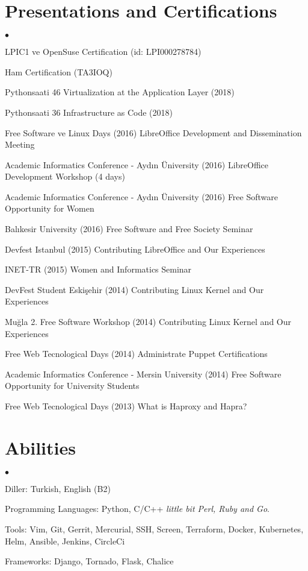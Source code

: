 \documentclass[margin,line]{res}
\newenvironment{list2}{
  \begin{list}{$\bullet$}{%
      \setlength{\itemsep}{0in}
      \setlength{\parsep}{0in} \setlength{\parskip}{0in}
      \setlength{\topsep}{0in} \setlength{\partopsep}{0in}
      \setlength{\leftmargin}{0.1in}}}{\end{list}}
\begin{document}
\begin{resume}
\section{\sc Presentations and Certifications}
\begin{list2}
\item LPIC1 ve OpenSuse Certification (id: LPI000278784)
\item Ham Certification (TA3IOQ)
\item Pythonsaati 46 Virtualization at the Application Layer (2018)
\item Pythonsaati 36 Infrastructure as Code (2018)
\item Free Software ve Linux Days (2016)  LibreOffice Development and Dissemination Meeting 
\item Academic Informatics Conference - Ayd{\i}n \"{U}niversity (2016) LibreOffice Development Workshop (4 days)
\item Academic Informatics Conference - Ayd{\i}n \"{U}niversity (2016) Free Software Opportunity for Women
\item Bal{\i}kesir University (2016) Free Software and Free Society Seminar
\item Devfest Istanbul (2015) Contributing LibreOffice and Our Experiences
\item INET-TR (2015) Women and Informatics Seminar 
\item DevFest Student Eski\c{s}ehir (2014) Contributing Linux Kernel and Our Experiences
\item Mu\u{g}la 2. Free Software Workshop (2014) Contributing Linux Kernel and Our Experiences
\item Free Web Tecnological Days (2014) Administrate Puppet Certifications
\item Academic Informatics Conference - Mersin University (2014) Free Software Opportunity for University Students
\item Free Web Tecnological Days (2013) What is Haproxy and Hapra?
\end{list2}
\vspace{-.3cm}

\section{\sc Abilities}
\begin{list2}
\item Diller: Turkish, English (B2)
\item Programming Languages: Python, C/C++ {\em little bit Perl, Ruby and Go}.
\item Tools: Vim, Git, Gerrit, Mercurial, SSH, Screen, Terraform, Docker, Kubernetes, Helm, Ansible, Jenkins, CircleCi
\item Frameworks: Django, Tornado, Flask, Chalice
\end{list2}


\end{resume}
\end{document}
